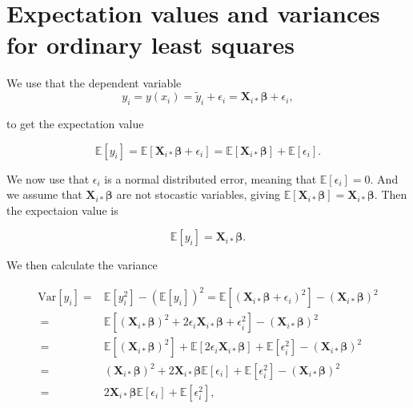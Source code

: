 \appendix
\section{Expectation values and variances for ordinary least squares}\label{app:ols_expactation_variance}

We use that the dependent variable
$$
y_i = y(x_i) = \tilde{y}_i + \epsilon_i = \mathbf X_{i*}\boldsymbol{\beta} + \epsilon_i,
$$

to get the expectation value



$$
\mathbb{E}[y_i] = \mathbb{E}[\mathbf X_{i*}\boldsymbol{\beta} + \epsilon_i] = \mathbb{E}[\mathbf X_{i*}\boldsymbol{\beta}] + \mathbb{E}[\epsilon_i].
$$

We now use that $\epsilon_i$ is a normal distributed error, meaning that $\mathbb{E}[\epsilon_i]=0$. And we assume that $\mathbf X_{i*}\boldsymbol{\beta}$ are not stocastic variables, giving $\mathbb{E}[\mathbf X_{i*}\boldsymbol{\beta}]=\mathbf X_{i*}\boldsymbol{\beta}$. Then the expectaion value is

\begin{equation}\label{eq:expectation_yi}
\mathbb{E}[y_i] = \mathbf X_{i*}\boldsymbol{\beta}.
\end{equation}

We then calculate the variance


\begin{align*}
\mbox{Var}[y_i] =& \mathbb{E}[y_i^2] - (\mathbb{E}[y_i])^2 = \mathbb{E}[(\mathbf X_{i*}\boldsymbol{\beta} + \epsilon_i)^2]- (\mathbf X_{i*}\boldsymbol{\beta})^2
\\
\ =& \mathbb{E}[(\mathbf X_{i*}\boldsymbol{\beta})^2+2\epsilon_i \mathbf X_{i*}\boldsymbol{\beta}+\epsilon_i^2]-(\mathbf X_{i*}\boldsymbol{\beta})^2
\\
\ =& \mathbb{E}[(\mathbf X_{i*}\boldsymbol{\beta})^2] + \mathbb{E}[2\epsilon_i \mathbf X_{i*}\boldsymbol{\beta}] + \mathbb{E}[\epsilon_i^2]-(\mathbf X_{i*}\boldsymbol{\beta})^2
\\
\ =& (\mathbf X_{i*}\boldsymbol{\beta})^2 + 2\mathbf X_{i*}\boldsymbol{\beta}\mathbb{E}[\epsilon_i ] + \mathbb{E}[\epsilon_i^2]-(\mathbf X_{i*}\boldsymbol{\beta})^2
\\
\ =& 2\mathbf X_{i*}\boldsymbol{\beta}\mathbb{E}[\epsilon_i ] + \mathbb{E}[\epsilon_i^2],
\end{align*}


